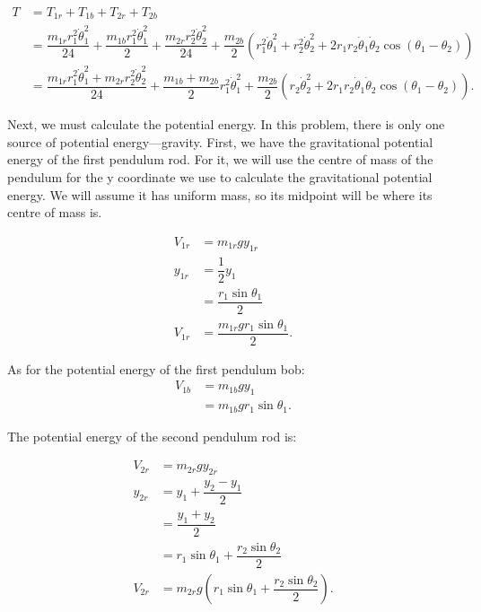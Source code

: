 \documentclass[12pt,a4paper,landscape]{article}
\begin{document}
	\begin{align*}
		T &= T_{1r} + T_{1b} + T_{2r} + T_{2b} \\
		&= \dfrac{m_{1r}r_1^2\dot{\theta}_1^2}{24} + \dfrac{m_{1b} r_1^2 \dot{\theta}_1^2}{2} + \dfrac{m_{2r} r_2^2\dot{\theta}_2^2}{24} + \dfrac{m_{2b}}{2} \left(r_1^2 \dot{\theta}_1^2 + r_2^2 \dot{\theta}_2^2 + 2r_1 r_2 \dot{\theta}_1 \dot{\theta}_2 \cos{\left(\theta_1-\theta_2\right)}\right) \\
		&= \dfrac{m_{1r} r_1^2 \dot{\theta}_1^2 + m_{2r}r_2^2 \dot{\theta}_2^2}{24} + \dfrac{m_{1b}+m_{2b}}{2}r_1^2 \dot{\theta}_1^2 + \dfrac{m_{2b}}{2} \left(r_2\dot{\theta}_2^2 + 2r_1 r_2 \dot{\theta}_1 \dot{\theta}_2 \cos{\left(\theta_1 - \theta_2\right)}\right).
	\end{align*}
	
	Next, we must calculate the potential energy. In this problem, there is only one source of potential energy---gravity. First, we have the gravitational potential energy of the first pendulum rod. For it, we will use the centre of mass of the pendulum for the y coordinate we use to calculate the gravitational potential energy. We will assume it has uniform mass, so its midpoint will be where its centre of mass is. 
	
	\begin{align*}
		V_{1r} &= m_{1r} gy_{1r} \\
		y_{1r} &= \dfrac{1}{2} y_1 \\
		&= \dfrac{r_1 \sin{\theta_1}}{2} \\
		V_{1r} &= \dfrac{m_{1r}gr_1 \sin{\theta_1}}{2}.
	\end{align*}
	
	As for the potential energy of the first pendulum bob:
	\begin{align*}
		V_{1b} &= m_{1b} gy_1 \\
		&= m_{1b}gr_1 \sin{\theta_1}.
	\end{align*}
	
	The potential energy of the second pendulum rod is:
	
	\begin{align*}
		V_{2r} &= m_{2r} gy_{2r} \\
		y_{2r} &= y_1 + \dfrac{y_2-y_1}{2}\\
		&= \dfrac{y_1+y_2}{2} \\
		&= r_1 \sin{\theta_1} + \dfrac{r_2\sin{\theta_2}}{2} \\
		V_{2r} &= m_{2r}g \left(r_1 \sin{\theta_1} + \dfrac{r_2\sin{\theta_2}}{2}\right).
	\end{align*}
	
\end{document}
